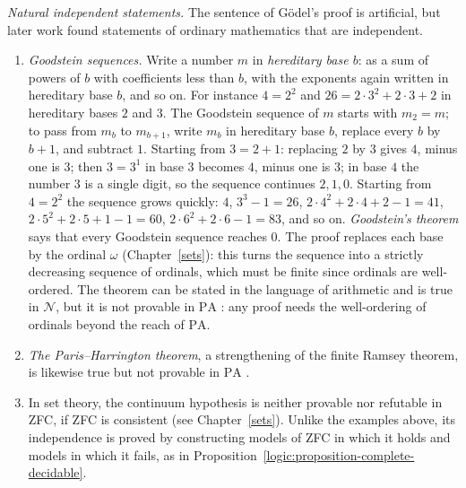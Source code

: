 \begin{example}\label{logic:example-independent-statements}
\emph{Natural independent statements.} The sentence of G\"odel's proof is artificial, but later work found statements of ordinary mathematics that are independent.
\begin{enumerate}
\item \emph{Goodstein sequences.} Write a number $m$ in \emph{hereditary base $b$}: as a sum of powers of $b$ with coefficients less than $b$, with the exponents again written in
hereditary base $b$, and so on. For instance $4 = 2^2$ and $26 = 2 \cdot 3^2 + 2 \cdot 3 + 2$ in hereditary bases $2$ and $3$. The Goodstein sequence of $m$ starts with $m_2 = m$;
to pass from $m_b$ to $m_{b+1}$, write $m_b$ in hereditary base $b$, replace every $b$ by $b + 1$, and subtract $1$. Starting from $3 = 2 + 1$: replacing $2$ by $3$ gives $4$,
minus one is $3$; then $3 = 3^1$ in base $3$ becomes $4$, minus one is $3$; in base $4$ the number $3$ is a single digit, so the sequence continues $2, 1, 0$. Starting from $4 = 2^2$
the sequence grows quickly: $4$, $3^3 - 1 = 26$, $2 \cdot 4^2 + 2 \cdot 4 + 2 - 1 = 41$, $2 \cdot 5^2 + 2 \cdot 5 + 1 - 1 = 60$, $2 \cdot 6^2 + 2 \cdot 6 - 1 = 83$, and so on.
\emph{Goodstein's theorem} \cite{goodstein-1944} says that every Goodstein sequence reaches $0$. The proof replaces each base by the ordinal $\omega$ (Chapter~\ref{sets}): this turns the
sequence into a strictly decreasing sequence of ordinals, which must be finite since ordinals are well-ordered. The theorem can be stated in the language of arithmetic and is
true in $\mathcal{N}$, but it is not provable in $\mathrm{PA}$ \cite{kirby-paris-1982}: any proof needs the well-ordering of ordinals beyond the reach of $\mathrm{PA}$.
\item \emph{The Paris--Harrington theorem}, a strengthening of the finite Ramsey theorem, is likewise true but not provable in $\mathrm{PA}$ \cite{paris-harrington-1977}.
\item In set theory, the continuum hypothesis is neither provable nor refutable in ZFC, if ZFC is consistent \cite{godel-1938, cohen-1963}
(see Chapter~\ref{sets}). Unlike the examples above, its independence is proved by constructing models of ZFC in which it holds and
models in which it fails, as in Proposition~\ref{logic:proposition-complete-decidable}.
\end{enumerate}
\end{example}

